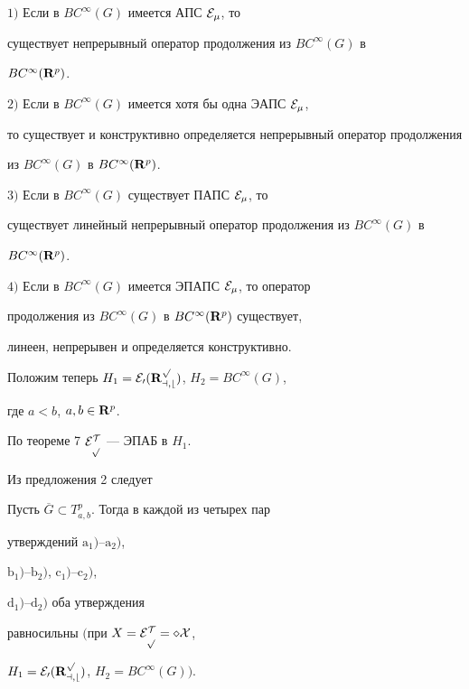 \begin{thm}


$1)$ Если в $BC^{\infty}(G)$ имеется АПС $\cal{E}_{\mu}$, то


существует непрерывный оператор продолжения из $BC^{\infty}(G)$ в


$BC^{\infty}({\bold R}^p)$.





$2)$ Если в $BC^{\infty}(G)$ имеется хотя бы одна ЭАПС $\cal{E}_{\mu}$,


то существует и конструктивно определяется непрерывный оператор продолжения


из $BC^{\infty}(G)$ в $BC^{\infty}({\bold R}^p)$.





$3)$ Если в $BC^{\infty}(G)$ существует ПАПС $\cal{E}_{\mu}$, то


существует линейный непрерывный оператор продолжения из $BC^{\infty}(G)$ в


$BC^{\infty}({\bold R}^p)$.





$4)$ Если в $BC^{\infty}(G)$ имеется ЭПАПС $\cal{E}_{\mu}$, то оператор


продолжения из $BC^{\infty}(G)$ в $BC^{\infty}({\bold R}^p)$ существует,


линеен, непрерывен и определяется конструктивно.


\end{thm}





Положим теперь $H_1=\cal{E}_0({\bold R}^p_{a,b})$, $H_2=BC^{\infty}(G)$,


где $a<b$, $a,b\in {\bold R}^p$.


По теореме 7 $\cal{E}^T_p$ --- ЭПАБ в $H_1$.


Из предложения 2 следует








\begin{thm}


Пусть $\overline{G}\subset T^p_{a,b}$. Тогда в каждой из четырех пар


утверждений $\mathrm a_1)$--$\mathrm a_2)$,


$\mathrm b_1)$--$\mathrm b_2)$, $\mathrm c_1)$--$\mathrm c_2)$,


$\mathrm d_1)$--$\mathrm d_2)$ оба утверждения


равносильны $($при $X=\cal{E}^T_p=\Pi X$,


$H_1=\cal{E}_0({\bold R}^p_{a,b})$, $H_2=BC^{\infty}(G))$.


\end{thm}





